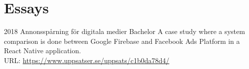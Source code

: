 \section{Essays}



\begin{entrylist}
  \entry
    {2018}
    {Annonsspårning för digitala medier}
    {Bachelor}
    {%
      A case study where a system comparison is done between Google Firebase and Facebook Ads Platform in a React Native application. \\URL: \href{https://www.uppsatser.se/uppsats/c1b0da78d4/}{https://www.uppsatser.se/uppsats/c1b0da78d4/}
      }
\end{entrylist}
